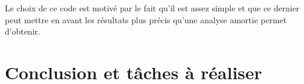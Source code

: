 \documentclass[12pt]{article}
\begin{document}
Le choix de ce code est motivé par le fait qu'il est assez simple et que
ce dernier peut mettre en avant les résultats plus précis qu'une analyse
amortie permet d'obtenir.

\begin{Shaded}
      \begin{Highlighting}[]
            \NormalTok{ =}
            \NormalTok{  | }
            \NormalTok{  | } 
            \NormalTok{  ;;}


            \NormalTok{  (}
            \NormalTok{  ;;}

            \NormalTok{    (}
            \NormalTok{      (}
            \NormalTok{      | [] {-}\textgreater{} (}
            \NormalTok{                | [] {-}\textgreater{} (}
            \NormalTok{              )}
            \NormalTok{    )}
            \NormalTok{  ;;}

            \NormalTok{ elems = [}\NormalTok{;}\NormalTok{;}\NormalTok{;}\NormalTok{;}\NormalTok{;}\NormalTok{;}\NormalTok{];;}
      \end{Highlighting}
\end{Shaded}

\hypertarget{conclusion-et-tuxe2ches-uxe0-ruxe9aliser}{%
      \section{Conclusion et tâches à
        réaliser}\label{conclusion-et-tuxe2ches-uxe0-ruxe9aliser}}
\end{document}
